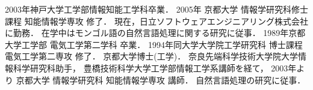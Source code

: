 \begin{biography}
{2003年神戸大学工学部情報知能工学科卒業．
2005年 京都大学 情報学研究科修士課程 知能情報学専攻 修了．
現在，日立ソフトウェアエンジニアリング株式会社に勤務．
在学中はモンゴル語の自然言語処理に関する研究に従事．
}
{1989年京都大学工学部 電気工学第二学科 卒業．
1994年同大学大学院工学研究科 博士課程電気工学第二専攻 修了．
京都大学博士(工学)．
奈良先端科学技術大学院大学情報科学研究科助手，
豊橋技術科学大学工学部情報工学系講師を経て，
2003年より 京都大学 情報学研究科 知能情報学専攻 講師．
自然言語処理の研究に従事．
}


\end{biography}



